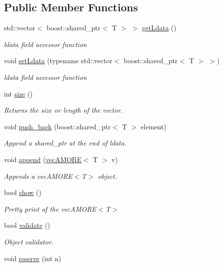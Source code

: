 \subsection*{Public Member Functions}
\begin{DoxyCompactItemize}
\item 
std::vector$<$ boost::shared\_\-ptr$<$ T $>$ $>$ \hyperlink{classvec_a_m_o_r_e_aeabf8a479f9031cc8ef9af0a971a08ea}{getLdata} ()
\begin{DoxyCompactList}\small\item\em ldata field accessor function \end{DoxyCompactList}\item 
void \hyperlink{classvec_a_m_o_r_e_ad1594c084d534c3de7acedd714f2e12a}{setLdata} (typename std::vector$<$ boost::shared\_\-ptr$<$ T $>$ $>$)
\begin{DoxyCompactList}\small\item\em ldata field accessor function \end{DoxyCompactList}\item 
int \hyperlink{classvec_a_m_o_r_e_ae1289a7870dbdd19b6455a890e94ce48}{size} ()
\begin{DoxyCompactList}\small\item\em Returns the size or length of the vector. \end{DoxyCompactList}\item 
void \hyperlink{classvec_a_m_o_r_e_a7b02ec757039b4d8fa98c3682002f156}{push\_\-back} (boost::shared\_\-ptr$<$ T $>$ element)
\begin{DoxyCompactList}\small\item\em Append a shared\_\-ptr at the end of ldata. \end{DoxyCompactList}\item 
void \hyperlink{classvec_a_m_o_r_e_ab060ffa67e85997fc4236bedfd2f17b6}{append} (\hyperlink{classvec_a_m_o_r_e}{vecAMORE}$<$ T $>$ v)
\begin{DoxyCompactList}\small\item\em Appends a vecAMORE$<$T$>$ object. \end{DoxyCompactList}\item 
bool \hyperlink{classvec_a_m_o_r_e_a11b0ffb0d2481f1960cb49a26b227d37}{show} ()
\begin{DoxyCompactList}\small\item\em Pretty print of the vecAMORE$<$T$>$ \end{DoxyCompactList}\item 
bool \hyperlink{classvec_a_m_o_r_e_a247aaafe9115cc433fc3be297c1f568e}{validate} ()
\begin{DoxyCompactList}\small\item\em Object validator. \end{DoxyCompactList}\item 
void \hyperlink{classvec_a_m_o_r_e_ad8b51e17ac5ba203cb3d0221b4f7de2f}{reserve} (int n)
\end{DoxyCompactItemize}
